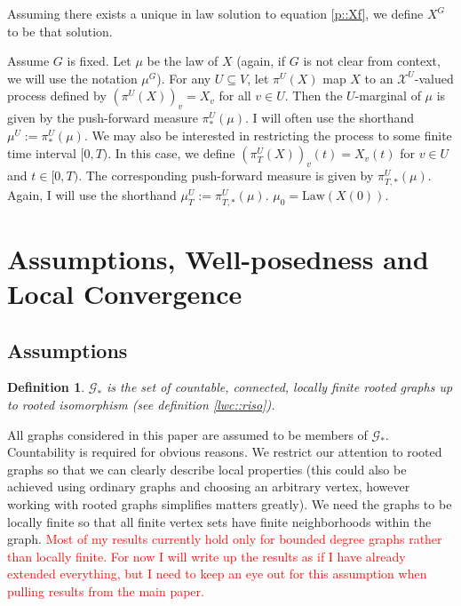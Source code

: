 \documentclass[12pt]{article}
\newcommand{\mc}{\mathcal}
\newcommand{\te}{\text}
\newcommand{\tr}{\textcolor{red}}
\newcommand{\ind}{\hspace{24pt}}
\newcommand{\defeq}{:=}								%
\newcommand{\sta}{\mc{X}}							%
\newcommand{\Xf}{X}									%
\newcommand{\m}{\mu}								%
\newcommand{\proj}{\pi}								%
\newcommand{\vind}[1]{_{#1}}						%
\newcommand{\tme}[1]{(#1)}							%
\newcommand{\gind}[1]{^{#1}}						%
\newcommand{\vpara}[1]{^{#1}}						%
\newcommand{\tpara}[1]{_{#1}}						%
\newcommand{\psf}{_*}								%
\newcommand{\tparapsf}[1]{_{#1,*}}					%
\newcommand{\Gs}{\mc{G}_\ast}						%
\newcommand{\law}{\te{Law}}							%
\newtheorem{defn}[thms]{Definition}
\begin{document}
Assuming there exists a unique in law solution to equation \eqref{p::Xf}, we define \(\Xf\gind{G}\) to be that solution. 

\ind Assume \(G\) is fixed. Let \(\m\) be the law of \(\Xf\) (again, if \(G\) is not clear from context, we will use the notation \(\m\gind{G}\)). For any \(U \subseteq V\), let \(\proj\vpara{U}(\Xf)\) map \(\Xf\) to an \(\sta^U\)-valued process defined by \((\proj\vpara{U}(\Xf))\vind{v} = \Xf\vind{v}\) for all \(v\in U\). Then the \(U\)-marginal of \(\m\) is given by the push-forward measure \(\proj\vpara{U}\psf(\m)\). I will often use the shorthand \(\m\vpara{U} \defeq \proj\psf\vpara{U}(\m)\). We may also be interested in restricting the process to some finite time interval \([0,T)\). In this case, we define \((\proj\vpara{U}\tpara{T}(\Xf))\vind{v}\tme{t} = \Xf\vind{v}\tme{t}\) for \(v \in U\) and \(t \in [0,T)\). The corresponding push-forward measure is given by \(\proj\vpara{U}\tparapsf{T}(\m)\). Again, I will use the shorthand \(\m\vpara{U}\tpara{T} \defeq \proj\vpara{U}\tparapsf{T}(\m)\). \(\m\tpara{0} = \law(\Xf\tme{0})\).

\section{Assumptions, Well-posedness and Local Convergence}
\label{awl}
\subsection{Assumptions}
\label{awl::a}
\begin{defn}
\(\Gs\) is the set of countable, connected, locally finite rooted graphs up to rooted isomorphism (see definition \ref{lwc::riso}).
\label{a::gstar}
\end{defn}

All graphs considered in this paper are assumed to be members of \(\Gs\). Countability is required for obvious reasons. We restrict our attention to rooted graphs so that we can clearly describe local properties (this could also be achieved using ordinary graphs and choosing an arbitrary vertex, however working with rooted graphs simplifies matters greatly). We need the graphs to be locally finite so that all finite vertex sets have finite neighborhoods within the graph. \tr{Most of my results currently hold only for bounded degree graphs rather than locally finite. For now I will write up the results as if I have already extended everything, but I need to keep an eye out for this assumption when pulling results from the main paper.}
\end{document}
